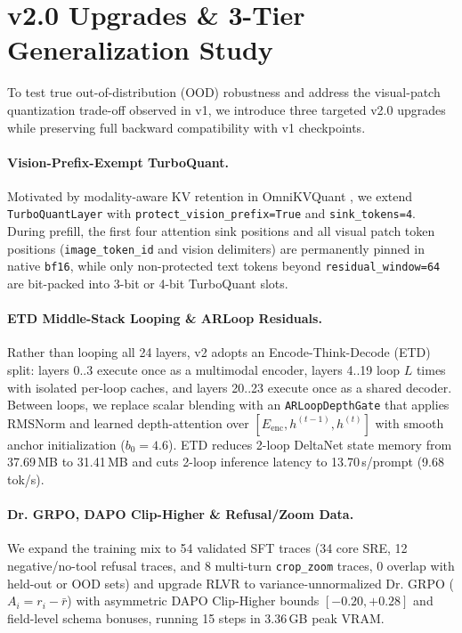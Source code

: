 \documentclass[10pt,letterpaper]{article}
\begin{document}
\section{v2.0 Upgrades \& 3-Tier Generalization Study}
To test true out-of-distribution (OOD) robustness and address the visual-patch quantization trade-off observed in v1, we introduce three targeted v2.0 upgrades while preserving full backward compatibility with v1 checkpoints.

\paragraph{Vision-Prefix-Exempt TurboQuant.} Motivated by modality-aware KV retention in OmniKVQuant \cite{omnikvquant}, we extend \texttt{TurboQuantLayer} with \texttt{protect\_vision\_prefix=True} and \texttt{sink\_tokens=4}. During prefill, the first four attention sink positions and all visual patch token positions (\texttt{image\_token\_id} and vision delimiters) are permanently pinned in native \texttt{bf16}, while only non-protected text tokens beyond \texttt{residual\_window=64} are bit-packed into 3-bit or 4-bit TurboQuant slots.

\paragraph{ETD Middle-Stack Looping \& ARLoop Residuals.} Rather than looping all 24 layers, v2 adopts an Encode-Think-Decode (ETD) split: layers 0..3 execute once as a multimodal encoder, layers 4..19 loop $L$ times with isolated per-loop caches, and layers 20..23 execute once as a shared decoder. Between loops, we replace scalar blending with an \texttt{ARLoopDepthGate} \cite{arloop} that applies RMSNorm and learned depth-attention over $[E_{\text{enc}}, h^{(t-1)}, h^{(t)}]$ with smooth anchor initialization ($b_0=4.6$). ETD reduces 2-loop DeltaNet state memory from 37.69\,MB to 31.41\,MB and cuts 2-loop inference latency to 13.70\,s/prompt (9.68\,tok/s).

\paragraph{Dr. GRPO, DAPO Clip-Higher \& Refusal/Zoom Data.} We expand the training mix to 54 validated SFT traces (34 core SRE, 12 negative/no-tool refusal traces, and 8 multi-turn \texttt{crop\_zoom} traces, 0 overlap with held-out or OOD sets) and upgrade RLVR to variance-unnormalized Dr. GRPO ($A_i = r_i - \bar{r}$) with asymmetric DAPO Clip-Higher bounds $[-0.20, +0.28]$ \cite{dapo} and field-level schema bonuses, running 15 steps in 3.36\,GB peak VRAM.
\end{document}

